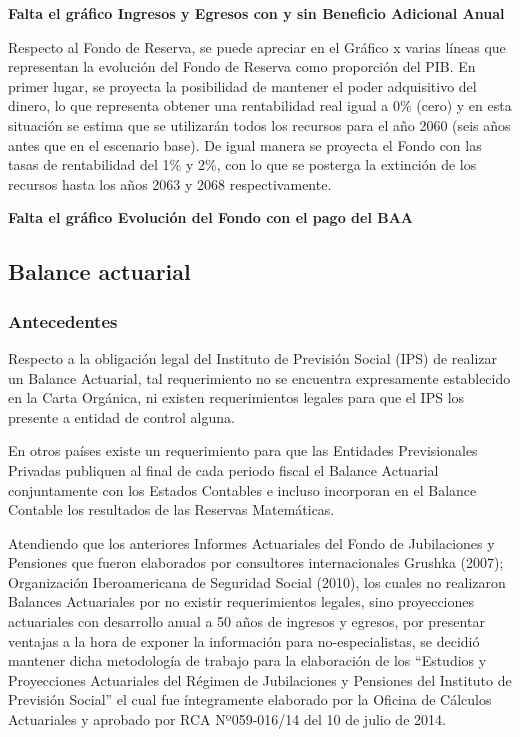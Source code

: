 \documentclass[a4paper,11pt]{article}
\begin{document}
\textbf{Falta el gráfico Ingresos y Egresos con y sin Beneficio Adicional Anual}

Respecto al Fondo de Reserva, se puede apreciar en el Gráfico x varias líneas que representan la evolución del Fondo de Reserva como proporción del PIB. En primer lugar, se proyecta la posibilidad de mantener el poder adquisitivo del dinero, lo que representa obtener una rentabilidad real igual a 0\% (cero) y en esta situación se estima que se utilizarán todos los recursos para el año 2060 (seis años antes que en el escenario base). De igual manera se proyecta el Fondo con las tasas de rentabilidad del 1\% y 2\%, con lo que se posterga la extinción de los recursos hasta los años 2063 y 2068 respectivamente.

\textbf{Falta el gráfico Evolución del Fondo con el pago del BAA}

\subsection{Balance actuarial}

\subsubsection{Antecedentes}

Respecto a la obligación legal del Instituto de Previsión Social (IPS) de realizar un Balance Actuarial, tal requerimiento no se encuentra expresamente establecido en la Carta Orgánica, ni existen requerimientos legales para que el IPS los presente a entidad de control alguna.

En otros países existe un requerimiento para que las Entidades Previsionales Privadas publiquen al final de cada periodo fiscal el Balance Actuarial conjuntamente con los Estados Contables e incluso incorporan en el Balance Contable los resultados de las Reservas Matemáticas.

Atendiendo que los anteriores Informes Actuariales del Fondo de Jubilaciones y Pensiones que fueron elaborados por consultores internacionales Grushka (2007); Organización Iberoamericana de Seguridad Social (2010), los cuales no realizaron Balances Actuariales por no existir requerimientos legales, sino proyecciones actuariales con desarrollo anual a 50 años de ingresos y egresos, por presentar ventajas a la hora de exponer la información para no-especialistas, se decidió mantener dicha metodología de trabajo para la elaboración de los “Estudios y Proyecciones Actuariales del Régimen de Jubilaciones y Pensiones del Instituto de Previsión Social” el cual fue íntegramente elaborado por la Oficina de Cálculos Actuariales y aprobado por RCA Nº059-016/14 del 10 de julio de 2014.
\end{document}
